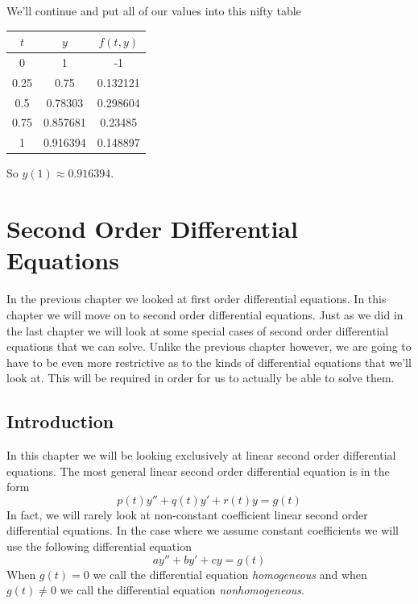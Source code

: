 \documentclass[10pt,reqno]{book}
\theoremstyle{definition}
\begin{document}
	\noindent We'll continue and put all of our values into this nifty table
	\begin{center}
	\begin{tabular}{c|c|c}
		$t$  &   $y$    & $f(t,y)$ \\ \hline
		0	 &    1     &    -1    \\
		0.25 &   0.75   & 0.132121 \\
		0.5  & 0.78303  & 0.298604 \\
		0.75 & 0.857681 & 0.23485  \\
		1    & 0.916394 & 0.148897
	\end{tabular}
	\end{center}
	So $ y(1) \approx 0.916394 $.

	\chapter{Second Order Differential Equations}\normalsize
	In the previous chapter we looked at first order differential equations. In this chapter we will move on to second order differential equations. Just as we did in the last chapter we will look at some special cases of second order differential equations that we can solve. Unlike the previous chapter however, we are going to have to be even more restrictive as to the kinds of differential equations that we’ll look at. This will be required in order for us to actually be able to solve them.

	\section{Introduction}

	In this chapter we will be looking exclusively at linear second order differential equations.  The most general linear second order differential equation is in the form
	\begin{equation}
		p(t)y'' + q(t)y' + r(t)y = g(t)
	\end{equation}
	In fact, we will rarely look at non-constant coefficient linear second order differential equations.  In the case where we assume constant coefficients we will use the following differential equation
	\begin{equation}
		ay'' + by' + cy = g(t)
	\end{equation}
	When $ g(t) = 0 $ we call the differential equation \textit{homogeneous} and when $ g(t) \neq 0 $ we call the differential equation \textit{nonhomogeneous}.
\end{document}
